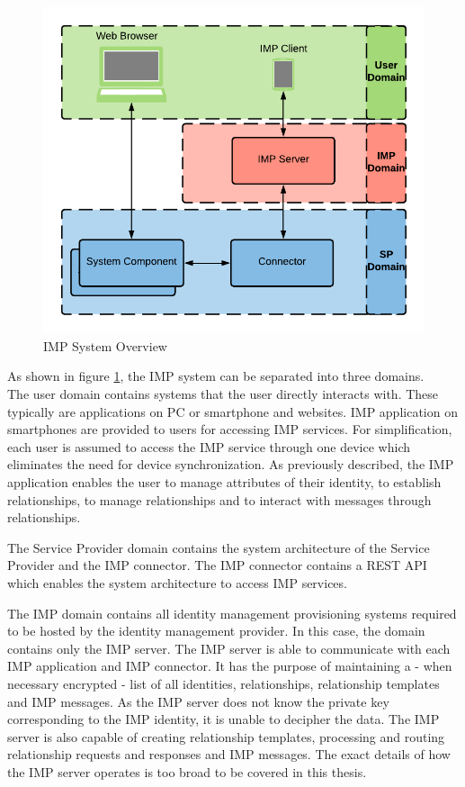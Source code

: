\begin{figure}[H]
    \centering
    \includegraphics[scale=0.6]{Diagrams/IMP System Overview.pdf}
    \caption{IMP System Overview}
    \label{imp:imp_system_overview}
\end{figure}

As shown in figure \ref{imp:imp_system_overview}, the IMP system can be separated into three domains. \\
The user domain contains systems that the user directly interacts with. These typically are applications on PC or smartphone and websites. IMP application on smartphones are provided to users for accessing IMP services. For simplification, each user is assumed to access the IMP service through one device which eliminates the need for device synchronization. As previously described, the IMP application enables the user to manage attributes of their identity, to establish relationships, to manage relationships and to interact with messages through relationships. 

The Service Provider domain contains the system architecture of the Service Provider and the IMP connector. The IMP connector contains a REST API which enables the system architecture to access IMP services.

The IMP domain contains all identity management provisioning systems required to be hosted by the identity management provider. In this case, the domain contains only the IMP server. The IMP server is able to communicate with each IMP application and IMP connector. It has the purpose of maintaining a - when necessary encrypted - list of all identities, relationships, relationship templates and IMP messages. As the IMP server does not know the private key corresponding to the IMP identity, it is unable to decipher the data. The IMP server is also capable of creating relationship templates, processing and routing relationship requests and responses and IMP messages. The exact details of how the IMP server operates is too broad to be covered in this thesis.

